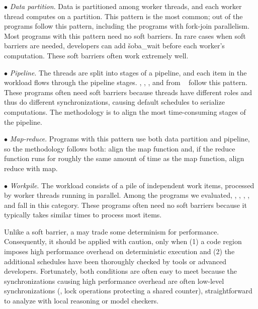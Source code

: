 \begin{tightenum}

\item[$\bullet$] {\em Data partition}. Data is partitioned among worker
  threads, and each worker thread computes on a partition. This pattern is
  the most common; \ndatapartition out of the \nprog programs follow this
  pattern, including the programs with fork-join parallelism.  Most
  programs with this pattern need no soft barriers.  In rare cases when
  soft barriers are needed, developers can add \v{soba\_wait} before each
  worker's computation.  These soft barriers often work extremely well.

\item[$\bullet$] {\em Pipeline}. The threads are split into stages of a
  pipeline, and each item in the workload flows through the pipeline
  stages.  \ferret, \dedup, \vips, and \xtwosixfour from \parsec~\cite{parsec} follow this pattern.
  These programs often need soft barriers because
  threads have different roles and thus do different synchronizations,
  causing default schedules to serialize computations.  The
  methodology is to align the most time-consuming stages of the
  pipeline.

\item[$\bullet$] {\em Map-reduce}. Programs with this pattern use both data
  partition and pipeline, so the methodology follows both: align the
  map function and, if the reduce function runs for roughly the same
  amount of time as the map function, align reduce with map.

\item[$\bullet$] {\em Workpile}. The workload consists of a pile of independent
  work items, processed by worker threads running in parallel.  Among the
  programs we evaluated, \bdb, \openldap, \redis, \pfscan, and \aget fall
  in this category.  These programs often need no soft barriers because
  it typically takes similar times to process most items.

\end{tightenum}


 Unlike a soft barrier, a \nondet may trade
some determinism for performance. Consequently, it should be applied with caution,
only when (1) a code region imposes high performance overhead on deterministic execution
and (2) the additional schedules have been thoroughly checked by tools or
advanced developers.  Fortunately, both conditions are often easy to meet
because the synchronizations causing high performance overhead are often low-level
synchronizations (\eg, lock operations protecting a shared counter),
straightforward to analyze with local reasoning or model checkers.

